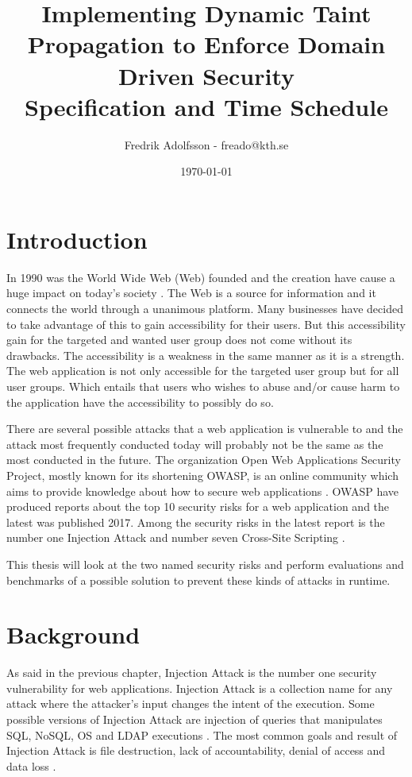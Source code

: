 \documentclass{../kththesis}
\title{Implementing Dynamic Taint Propagation to Enforce Domain Driven Security \\
				\large Specification and Time Schedule}
\author{Fredrik Adolfsson - freado@kth.se}
\date{\today}
\begin{document}
\frontmatter



\titlepage


\tableofcontents


\mainmatter



\chapter{Introduction}
In 1990 was the World Wide Web (Web) founded and the creation have cause a huge impact on today’s society \parencite{www}. The Web is a source for information and it connects the world through a unanimous platform. Many businesses have decided to take advantage of this to gain accessibility for their users. But this accessibility gain for the targeted and wanted user group does not come without its drawbacks. The accessibility is a weakness in the same manner as it is a strength. The web application is not only accessible for the targeted user group but for all user groups. Which entails that users who wishes to abuse and/or cause harm to the application have the accessibility to possibly do so. 

There are several possible attacks that a web application is vulnerable to and the attack most frequently conducted today will probably not be the same as the most conducted in the future. The organization Open Web Applications Security Project, mostly known for its shortening OWASP, is an online community which aims to provide knowledge about how to secure web applications \parencite{OpenWebApplicationSecurityProject}. OWASP have produced reports about the top 10 security risks for a web application and the latest was published 2017. Among the security risks in the latest report is the number one Injection Attack and number seven Cross-Site Scripting \parencite{OWASP2017, OpenWebApplicationSecurityProject, CrossMichael2007Dgtw}.

This thesis will look at the two named security risks and perform evaluations and benchmarks of a possible solution to prevent these kinds of attacks in runtime. 



\chapter{Background}
As said in the previous chapter, Injection Attack is the number one security vulnerability for web applications. Injection Attack is a collection name for any attack where the attacker’s input changes the intent of the execution. Some possible versions of Injection Attack are injection of queries that manipulates SQL, NoSQL, OS and LDAP executions \parencite{OWASP2017}. The most common goals and result of Injection Attack is file destruction, lack of accountability, denial of access and data loss \parencite{Secure_Web}.
\end{document}
